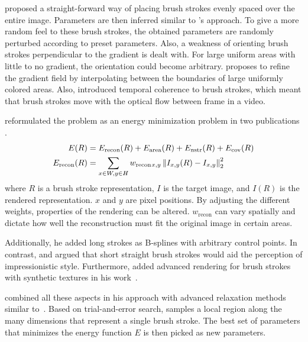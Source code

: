 \citeauthor*{apple} proposed a straight-forward way of placing brush strokes evenly spaced over the entire image.
Parameters are then inferred similar to \citeauthor*{paintbynumbers}'s approach.
To give a more random feel to these brush strokes, the obtained parameters are randomly perturbed according to preset parameters.
Also, a weakness of orienting brush strokes perpendicular to the gradient is dealt with.
For large uniform areas with little to no gradient, the orientation could become arbitrary.
\citeauthor*{apple} proposes to refine the gradient field by interpolating between the boundaries of large uniformly colored areas.
Also, \citeauthor*{apple} introduced temporal coherence to brush strokes, which meant that brush strokes move with the optical flow between frame in a video.

\citeauthor*{hertzmann} reformulated the problem as an energy minimization problem in two publications \cite{hertzmannreview, Hertzmann}.
\begin{align}
    E(R) & = E_{\text{recon}}(R) + E_{\text{area}}(R) + E_{\text{nstr}}(R) + E_{\text{cov}}(R) \\
    E_{\text{recon}}(R) & = \sum_{x \in W, y \in H} w_{\text{recon}}{}_{x, y} \left\lVert I_{x, y}(R) - I_{x, y}\right\rVert^2_2
\end{align}
where $R$ is a brush stroke representation, $I$ is the target image, and $I(R)$ is the rendered representation.
$x$ and $y$ are pixel positions.
By adjusting the different weights, properties of the rendering can be altered.
$w_{\text{recon}}$ can vary spatially and dictate how well the reconstruction must fit the original image in certain areas.

Additionally, he added long strokes as B-splines with arbitrary control points.
In contrast, \citeauthor*{paintbynumbers} and \citeauthor*{apple} argued that short straight brush strokes would aid the perception of impressionistic style.
Furthermore, \citeauthor*{Hertzmann} added advanced rendering for brush strokes with synthetic textures in his work~\cite{Hertzmann}.

\citeauthor*{Hertzmann} combined all these aspects in his approach with advanced relaxation methods similar to~\citeauthor*{paintbynumbers}.
Based on trial-and-error search, \citeauthor*{Hertzmann} samples a local region along the many dimensions that represent a single brush stroke.
The best set of parameters that minimizes the energy function $E$ is then picked as new parameters.

